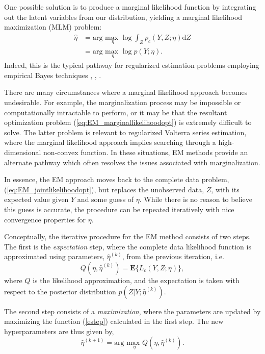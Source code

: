 One possible solution is to produce a marginal likelihood function by integrating out the latent variables from our distribution, yielding a marginal likelihood maximization (MLM) problem:
\begin{align}
\hat{\eta} &= \text{arg } \underset{\eta}{\text{max }} \log \int_Z p_c(Y,Z; \eta) \text{d}Z \\
&= \text{arg } \underset{\eta}{\text{max }} \log p(Y; \eta).
\label{eq:EM_marginallikelihoodopt}
\end{align}
Indeed, this is the typical pathway for regularized estimation problems employing empirical Bayes techniques \cite{Pillonetto2010}, \cite{Birpoutsoukis2017}, \cite{Lataire2016}.

There are many circumstances where a marginal likelihood approach becomes undesirable. For example, the marginalization process may be impossible or computationally intractable to perform, or it may be that the resultant optimization problem (\ref{eq:EM_marginallikelihoodopt}) is extremely difficult to solve. The latter problem is relevant to regularized Volterra series estimation, where the marginal likelihood approach implies searching through a high-dimensional non-convex function. In these situations, EM methods provide an alternate pathway which often resolves the issues associated with marginalization.

In essence, the EM approach moves back to the complete data problem, (\ref{eq:EM_jointlikelihoodopt}), but replaces the unobserved data, $Z$, with its expected value given $Y$ and some guess of $\eta$. While there is no reason to believe this guess is accurate, the procedure can be repeated iteratively with nice convergence properties for $\eta$. 

Conceptually, the iterative procedure for the EM method consists of two steps. The first is the \emph{expectation} step, where the complete data likelihood function is approximated using parameters, $\hat{\eta}^{(k)}$, from the previous iteration, i.e.
\begin{equation}
\label{estep}
Q(\eta,\hat{\eta}^{(k)}) = \textbf{E}\{  L_c(Y,Z;\eta) \},
\end{equation}
where $Q$ is the likelihood approximation, and the expectation is taken with respect to the posterior distribution $p(Z|Y; \hat{\eta}^{(k)})$.

The second step consists of a \emph{maximization}, where the parameters are updated by maximizing the function (\ref{estep}) calculated in the first step. The new hyperparameters are thus given by,
\begin{equation}
\hat{\eta}^{(k+1)} = \text{arg } \underset{\eta}{\text{max }} Q(\eta,\hat{\eta}^{(k)}).
\end{equation}

